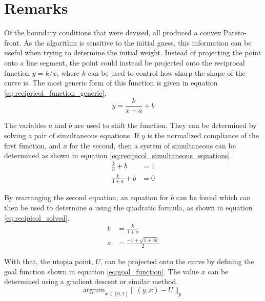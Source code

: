 \section{Remarks}
Of the boundary conditions that were devised, all produced a convex Pareto-front. As the algorithm is sensitive to the initial guess, this information can be useful when trying to determine the initial weight. Instead of projecting the point onto a line segment, the point could instead be projected onto the reciprocal function $y=k/x$, where $k$ can be used to control how sharp the shape of the curve is. The most generic form of this function is given in equation \ref{eq:recipricol_function_generic}.
\begin{equation}
    y = \frac{k}{x+a} + b
    \label{eq:recipricol_function_generic}
\end{equation}

The variables $a$ and $b$ are used to shift the function. They can be determined by solving a pair of simultaneous equations. If $y$ is the normalized compliance of the first function, and $x$ for the second, then a system of simultaneous can be determined as shown in equation \ref{eq:recipicol_simultaneous_equations}.
\begin{equation}
    \begin{split}
        \frac{k}{a} + b &= 1 \\
        \frac{k}{1 + a} + b &= 0
    \end{split}
    \label{eq:recipicol_simultaneous_equations}
\end{equation}

By rearranging the second equation, an equation for $b$ can be found which can then be used to determine $a$ using the quadratic formula, as shown in equation \ref{eq:recipicol_solved}.
\begin{equation}
    \begin{split}
        b &= \frac{k}{1 + a} \\
        a &= \frac{-1 + \sqrt{1 + 4k}}{2}
    \end{split}
    \label{eq:recipicol_solved}
\end{equation}

With that, the utopia point, $U$, can be projected onto the curve by defining the goal function shown in equation \ref{eq:goal_function}. The value $x$ can be determined using a gradient descent or similar method.
\begin{equation}
    \text{argmin}_{x\in[0,1]} \lVert (y,x) - U\rVert _p
    \label{eq:goal_function}
\end{equation}

